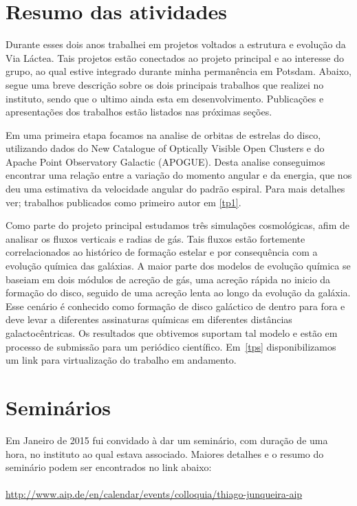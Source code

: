 \documentclass[a4paper, 12pt]{article}
\begin{document}
\newpage
{}
\section{Resumo das atividades}

Durante esses dois anos trabalhei em projetos voltados a estrutura e evolução da Via Láctea. Tais projetos estão conectados ao projeto principal e ao interesse do grupo, ao qual estive integrado durante minha permanência em Potsdam. Abaixo, segue uma breve descrição sobre os dois principais trabalhos que realizei no instituto, sendo que o ultimo ainda esta em desenvolvimento. Publicações e apresentações dos trabalhos estão listados nas próximas seções.  

Em uma primeira etapa focamos na analise de orbitas de estrelas do disco, utilizando dados do New Catalogue of Optically Visible Open Clusters e do Apache Point Observatory Galactic (APOGUE). Desta analise conseguimos encontrar uma relação entre a variação do momento angular e da energia, que nos deu uma estimativa da velocidade angular do padrão espiral. Para mais detalhes ver; trabalhos publicados como primeiro autor em \ref{tp1}. 

Como parte do projeto principal estudamos três simulações cosmológicas, afim de analisar os fluxos verticais e radias de gás. Tais fluxos estão fortemente correlacionados ao histórico de formação estelar e por consequência com a evolução química das galáxias. A maior parte dos modelos de evolução química se baseiam em dois módulos de acreção de gás, uma acreção rápida no inicio da formação do disco, seguido de uma acreção lenta ao longo da evolução da galáxia. Esse cenário é conhecido como formação de disco galáctico de dentro para fora e deve levar a diferentes assinaturas químicas em diferentes distâncias galactocêntricas. Os resultados que obtivemos suportam tal modelo e estão em processo de submissão para um periódico científico. Em~\ref{tps} disponibilizamos um link para virtualização do trabalho em andamento.  

\section {Seminários}

Em Janeiro de 2015 fui convidado à dar um seminário, com duração de uma hora, no instituto ao qual estava associado. Maiores detalhes e o resumo do seminário podem ser encontrados no link abaixo:   
\\
\\
\url{http://www.aip.de/en/calendar/events/colloquia/thiago-junqueira-aip}
\end{document}
